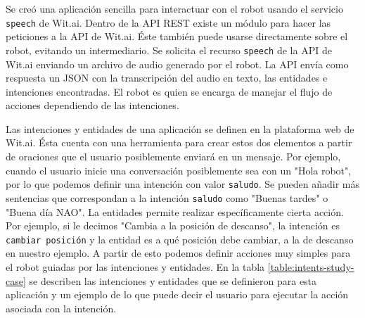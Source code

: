 Se creó una aplicación sencilla
para interactuar con el robot usando el servicio \texttt{speech} de
Wit.ai.
Dentro de la API REST existe un módulo para hacer las peticiones
a la API de Wit.ai. Éste también puede usarse directamente sobre
el robot, evitando un intermediario.
Se solicita el recurso \texttt{speech} de la API de Wit.ai 
enviando
un archivo de audio generado por el robot. La API
envía como respuesta un JSON con la transcripción del audio 
en texto, las entidades e intenciones encontradas.
El robot es quien se encarga de manejar el flujo de
acciones dependiendo de las intenciones.

Las intenciones y entidades de una aplicación se definen en la plataforma
web de Wit.ai. Ésta cuenta con una herramienta para
crear estos dos elementos a partir de oraciones que el usuario
posiblemente enviará en un mensaje. Por ejemplo,
cuando el usuario inicie una conversación posiblemente
sea con un "Hola robot", por lo que podemos definir una
intención con valor \texttt{saludo}.
Se pueden añadir más sentencias
que correspondan a la intención \texttt{saludo}
como "Buenas tardes" o
"Buena día NAO".
La entidades permite realizar específicamente cierta acción.
Por ejemplo, si le decimos "Cambia a la posición de descanso", la intención es \texttt{cambiar posición} y la
entidad es a qué posición debe cambiar, a la de descanso
en nuestro ejemplo.
A partir de esto podemos definir acciones muy simples
para el robot guiadas por las intenciones y entidades. En la tabla \ref{table:intents-study-case} se describen las intenciones y entidades que se
definieron para esta aplicación
y un ejemplo de lo que puede decir el usuario para ejecutar la acción asociada con la intención.

